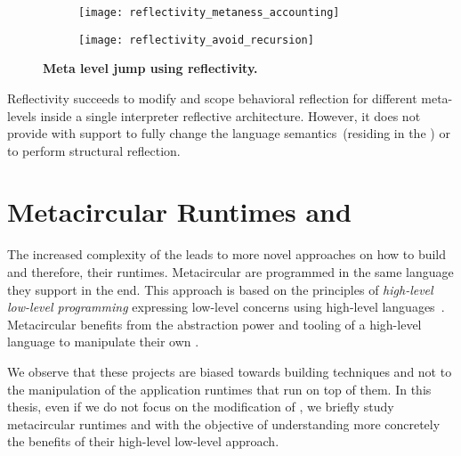 \begin{figure}[ht]
\begin{center}
\begin{subfigure}{.45\textwidth}
\texttt{[image: reflectivity\_metaness\_accounting]}
\end{subfigure}
\begin{subfigure}{.45\textwidth}
\texttt{[image: reflectivity\_avoid\_recursion]}
\end{subfigure}
\caption{\textbf{Meta level jump using reflectivity.}\label{fig:reflectivity_avoid_meta_recursion}
 }
\end{center}
\end{figure}

Reflectivity succeeds to modify and scope behavioral reflection for different meta-levels inside a single interpreter reflective architecture. However, it does not provide with support to fully change the language semantics~(residing in the \VM) or to perform structural reflection.

\section{Metacircular Runtimes and \VMs}\label{sec:metacircular_runtimes}

The increased complexity of the \VMs leads to more novel approaches on how to build \VMs and therefore, their runtimes.
Metacircular \VMs are \VMs programmed in the same language they support in the end. This approach is based on the principles of \emph{high-level low-level programming} \ie expressing low-level concerns using high-level languages~\cite{Fram09a}. Metacircular \VMs benefits from the abstraction power and tooling of a high-level language to manipulate their own \VMs. 

We observe that these projects are biased towards \VM building techniques and not to the manipulation of the application runtimes that run on top of them.
In this thesis, even if we do not focus on the modification of \VMs, we briefly study metacircular runtimes and \VMs with the objective of understanding more concretely the benefits of their high-level low-level approach.

